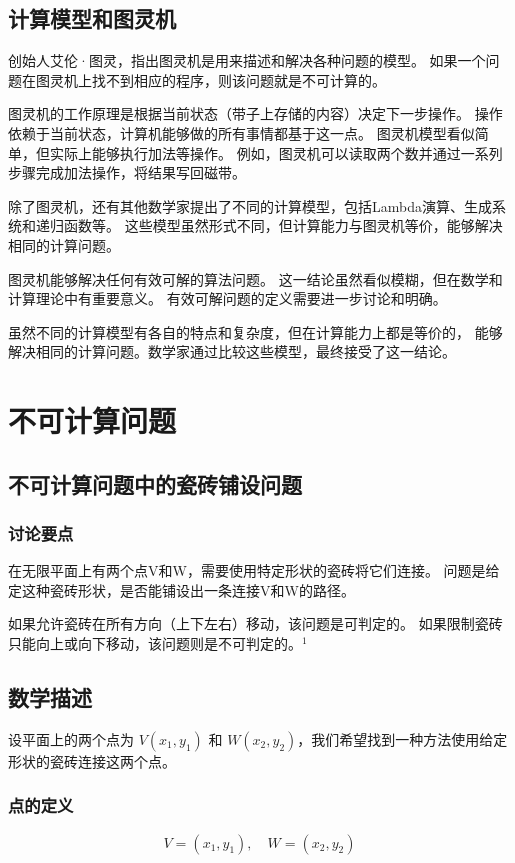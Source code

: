 \documentclass[UTF-8,a4paper,9pt]{article}
\begin{document}
\subsection{计算模型和图灵机}
创始人艾伦·图灵，指出图灵机是用来描述和解决各种问题的模型。
如果一个问题在图灵机上找不到相应的程序，则该问题就是不可计算的。

图灵机的工作原理是根据当前状态（带子上存储的内容）决定下一步操作。
操作依赖于当前状态，计算机能够做的所有事情都基于这一点。
图灵机模型看似简单，但实际上能够执行加法等操作。
例如，图灵机可以读取两个数并通过一系列步骤完成加法操作，将结果写回磁带。

除了图灵机，还有其他数学家提出了不同的计算模型，包括Lambda演算、生成系统和递归函数等。
这些模型虽然形式不同，但计算能力与图灵机等价，能够解决相同的计算问题。

图灵机能够解决任何有效可解的算法问题。
这一结论虽然看似模糊，但在数学和计算理论中有重要意义。
有效可解问题的定义需要进一步讨论和明确。

虽然不同的计算模型有各自的特点和复杂度，但在计算能力上都是等价的，
能够解决相同的计算问题。数学家通过比较这些模型，最终接受了这一结论。

\section{不可计算问题}

\subsection{不可计算问题中的瓷砖铺设问题}

\subsubsection{讨论要点}
在无限平面上有两个点V和W，需要使用特定形状的瓷砖将它们连接。
问题是给定这种瓷砖形状，是否能铺设出一条连接V和W的路径。

如果允许瓷砖在所有方向（上下左右）移动，该问题是可判定的。
如果限制瓷砖只能向上或向下移动，该问题则是不可判定的。$^1$

\subsection*{数学描述}

设平面上的两个点为 $V(x_1, y_1)$ 和 $W(x_2, y_2)$，我们希望找到一种方法使用给定形状的瓷砖连接这两个点。

\subsubsection*{点的定义}
\[
  V = (x_1, y_1), \quad W = (x_2, y_2) \tag{1}
\]
\end{document}
